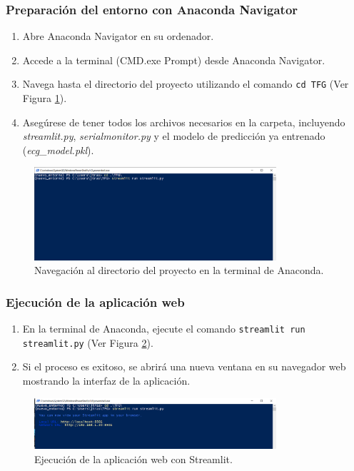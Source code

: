 \subsubsection{Preparación del entorno con Anaconda Navigator}
\begin{enumerate}
    \item Abre Anaconda Navigator en su ordenador.
    \item Accede a la terminal (CMD.exe Prompt) desde Anaconda Navigator.
    \item Navega hasta el directorio del proyecto utilizando el comando \texttt{cd TFG} (Ver Figura \ref{fig:ejecutar}).
    \item Asegúrese de tener todos los archivos necesarios en la carpeta, incluyendo \textit{streamlit.py}, \textit{serialmonitor.py} y el modelo de predicción ya entrenado (\textit{ecg\_model.pkl}).
\end{enumerate}

\begin{figure}[h]
    \centering
    \includegraphics[width=0.8\textwidth]{img/cd.png}
    \caption{Navegación al directorio del proyecto en la terminal de Anaconda.}
    \label{fig:ejecutar}
\end{figure}

\subsubsection{Ejecución de la aplicación web}
\begin{enumerate}
    \item En la terminal de Anaconda, ejecute el comando \texttt{streamlit run streamlit.py} (Ver Figura \ref{fig:ejecutar2}).
    \item Si el proceso es exitoso, se abrirá una nueva ventana en su navegador web mostrando la interfaz de la aplicación.
\end{enumerate}

\begin{figure}[h]
    \centering
    \includegraphics[width=0.8\textwidth]{img/cd2.png}
    \caption{Ejecución de la aplicación web con Streamlit.}
    \label{fig:ejecutar2}
\end{figure}


